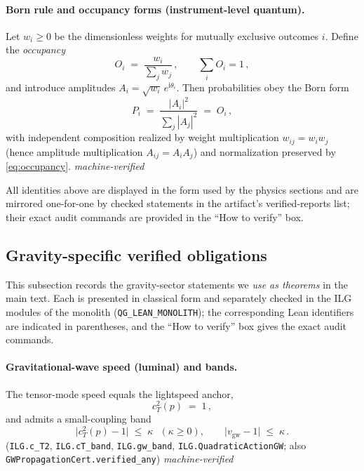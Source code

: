 \documentclass[12pt,a4paper]{article}
\begin{document}
\paragraph{Born rule and occupancy forms (instrument-level quantum).}
Let \(w_i\ge 0\) be the dimensionless weights for mutually exclusive outcomes \(i\). Define the \emph{occupancy}
\begin{equation}
  O_i \;=\; \frac{w_i}{\sum_j w_j}\,,\qquad \sum_i O_i = 1\,,
  \label{eq:occupancy}
\end{equation}
and introduce amplitudes \(A_i=\sqrt{w_i}\,e^{\mathrm{i}\theta_i}\). Then probabilities obey the Born form
\begin{equation}
  P_i \;=\; \frac{|A_i|^{2}}{\sum_j |A_j|^{2}} \;=\; O_i\,,
  \label{eq:born}
\end{equation}
with independent composition realized by weight multiplication \(w_{ij}=w_i w_j\) (hence amplitude multiplication \(A_{ij}=A_i A_j\)) and normalization preserved by \eqref{eq:occupancy}.
\hfill\emph{machine-verified}

\medskip
All identities above are displayed in the form used by the physics sections and are mirrored one-for-one by checked statements in the artifact’s verified-reports list; their exact audit commands are provided in the ``How to verify'' box.

\subsection{Gravity-specific verified obligations}
This subsection records the gravity-sector statements we \emph{use as theorems} in the main text. Each is presented in classical form and separately checked in the ILG modules of the monolith (\texttt{QG\_LEAN\_MONOLITH}); the corresponding Lean identifiers are indicated in parentheses, and the ``How to verify'' box gives the exact audit commands.

\paragraph{Gravitational-wave speed (luminal) and bands.}
The tensor-mode speed equals the lightspeed anchor,
\begin{equation}
  c_T^2(p) \;=\; 1\,,
  \label{eq:gw-speed}
\end{equation}
and admits a small-coupling band
\begin{equation}
  \bigl|c_T^2(p)-1\bigr| \;\le\; \kappa\ \ \ (\kappa\ge 0), 
  \qquad 
  \bigl|v_{\mathrm{gw}}-1\bigr| \;\le\; \kappa\,.
  \label{eq:gw-band}
\end{equation}
(\texttt{ILG.c\_T2}, \texttt{ILG.cT\_band}, \texttt{ILG.gw\_band}, \texttt{ILG.QuadraticActionGW}; also \texttt{GWPropagationCert.verified\_any}) \hfill\emph{machine-verified}
\end{document}
